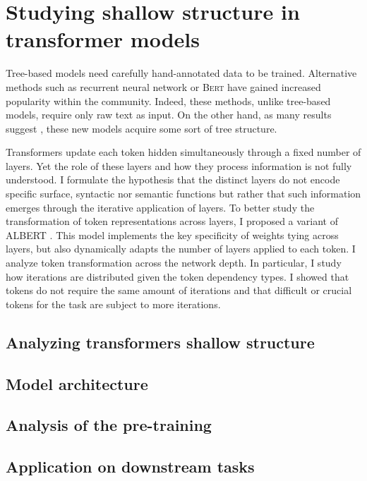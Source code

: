 \setchapterpreamble[u]{\margintoc}
\chapter{Studying shallow structure in transformer models}

Tree-based models need carefully hand-annotated data to be trained. Alternative methods such as recurrent neural network \parencite{hochreiter_97, cho_14} or \textsc{Bert} \parencite{devlin_19} have gained increased popularity within the community. Indeed, these methods, unlike tree-based models, require only raw text as input. On the other hand, as many results suggest \parencite{linzen_16, jawahar_19, clark_19}, these new models acquire some sort of tree structure.


Transformers update each token hidden simultaneously through a fixed number of layers. Yet the role of these layers and how they process information is not fully understood. I formulate the hypothesis that the distinct layers do not encode specific surface, syntactic nor semantic functions but rather that such information emerges through the iterative application of layers. To better study the transformation of token representations across layers, I proposed a variant of ALBERT \parencite{simoulin_2021b}. This model implements the key specificity of weights tying across layers, but also dynamically adapts the number of layers applied to each token. I analyze token transformation across the network depth. In particular, I study how iterations are distributed given the token dependency types. I showed that tokens do not require the same amount of iterations and that difficult or crucial tokens for the task are subject to more iterations.

\section{Analyzing transformers shallow structure}

\section{Model architecture}

\section{Analysis of the pre-training}

\section{Application on downstream tasks}
